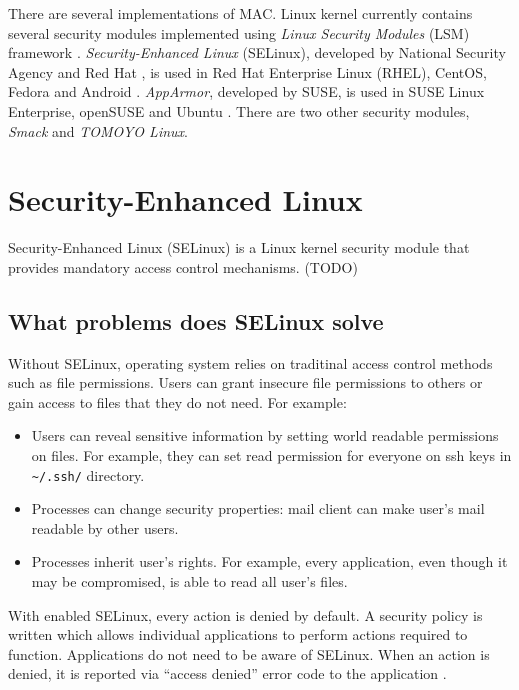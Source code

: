 There are several implementations of MAC. Linux kernel currently contains
several security modules implemented using \emph{Linux Security Modules} (LSM)
framework \cite{lsmusage}. \emph{Security-Enhanced Linux} (SELinux), developed
by National Security Agency and Red Hat \cite{selinuxcontr}, is used in Red Hat
Enterprise Linux (RHEL), CentOS, Fedora and Android
\cite{selinuxguide,selinuxguidefedora,selinuxandroid}. \emph{AppArmor},
developed by SUSE, is used in SUSE Linux Enterprise, openSUSE and Ubuntu
\cite{apparmor,apparmorubuntu}. There are two other security modules,
\emph{Smack} and \emph{TOMOYO Linux}.

\section{Security-Enhanced Linux}
Security-Enhanced Linux (SELinux) is a Linux kernel security module that
provides mandatory access control mechanisms. (TODO)

\subsection{What problems does SELinux solve}
Without SELinux, operating system relies on traditinal access control methods
such as file permissions. Users can grant insecure file permissions to others or
gain access to files that they do not need. For example:
\begin{itemize}
    \item Users can reveal sensitive information by setting world readable
        permissions on files. For example, they can set read permission for
        everyone on ssh keys in \texttt{\textasciitilde/.ssh/} directory.
    \item Processes can change security properties: mail client can make user's
        mail readable by other users.
    \item Processes inherit user's rights. For example, every application, even
        though it may be compromised, is able to read all user's files.
\end{itemize}

With enabled SELinux, every action is denied by default. A security policy is
written which allows individual applications to perform actions required to
function. Applications do not need to be aware of SELinux. When an action is
denied, it is reported via ``access denied'' error code to the application
\cite{centoshowto}.

